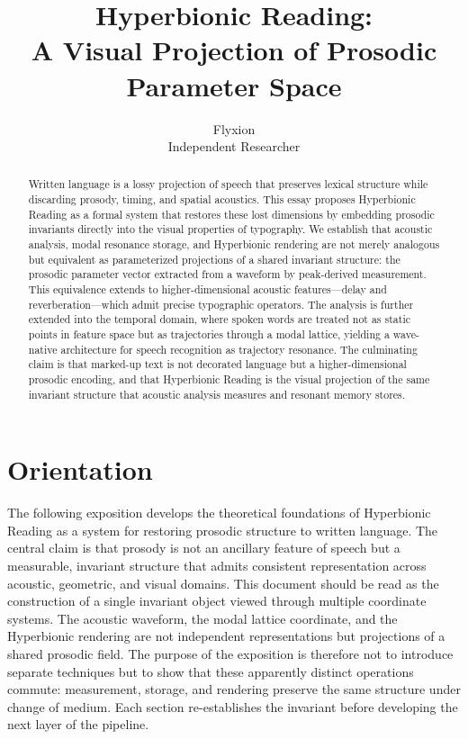 \documentclass[12pt, a4paper]{article}
\title{\textbf{Hyperbionic Reading:\\
A Visual Projection of Prosodic Parameter Space}}
\author{Flyxion\\
\small Independent Researcher}
\date{}
\begin{document}
\maketitle

\begin{abstract}
\noindent
Written language is a lossy projection of speech that preserves lexical structure while discarding prosody, timing, and spatial acoustics. This essay proposes Hyperbionic Reading as a formal system that restores these lost dimensions by embedding prosodic invariants directly into the visual properties of typography. We establish that acoustic analysis, modal resonance storage, and Hyperbionic rendering are not merely analogous but equivalent as parameterized projections of a shared invariant structure: the prosodic parameter vector extracted from a waveform by peak-derived measurement. This equivalence extends to higher-dimensional acoustic features---delay and reverberation---which admit precise typographic operators. The analysis is further extended into the temporal domain, where spoken words are treated not as static points in feature space but as trajectories through a modal lattice, yielding a wave-native architecture for speech recognition as trajectory resonance. The culminating claim is that marked-up text is not decorated language but a higher-dimensional prosodic encoding, and that Hyperbionic Reading is the visual projection of the same invariant structure that acoustic analysis measures and resonant memory stores.
\end{abstract}

\newpage

\section*{Orientation}

The following exposition develops the theoretical foundations of Hyperbionic Reading as a system for restoring prosodic structure to written language. The central claim is that prosody is not an ancillary feature of speech but a measurable, invariant structure that admits consistent representation across acoustic, geometric, and visual domains. This document should be read as the construction of a single invariant object viewed through multiple coordinate systems. The acoustic waveform, the modal lattice coordinate, and the Hyperbionic rendering are not independent representations but projections of a shared prosodic field. The purpose of the exposition is therefore not to introduce separate techniques but to show that these apparently distinct operations commute: measurement, storage, and rendering preserve the same structure under change of medium. Each section re-establishes the invariant before developing the next layer of the pipeline.
\end{document}
